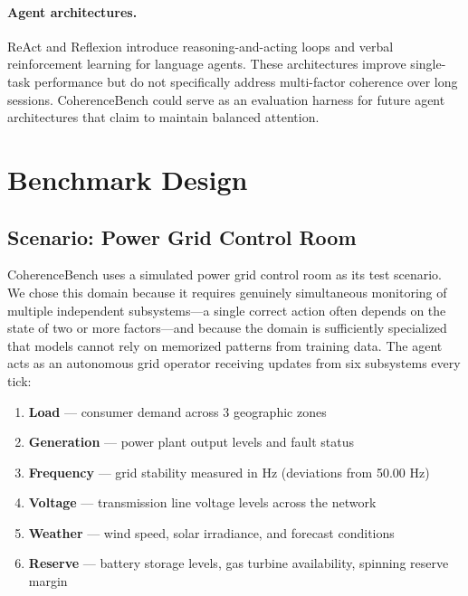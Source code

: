 \documentclass{article}
\begin{document}
\paragraph{Agent architectures.}
ReAct \cite{yao2023react} and Reflexion \cite{shinn2023reflexion}
introduce reasoning-and-acting loops and verbal reinforcement learning
for language agents. These architectures improve single-task performance
but do not specifically address multi-factor coherence over long
sessions. CoherenceBench could serve as an evaluation harness for
future agent architectures that claim to maintain balanced attention.

\section{Benchmark Design}
\label{sec:design}

\subsection{Scenario: Power Grid Control Room}

CoherenceBench uses a simulated power grid control room as its test
scenario. We chose this domain because it requires genuinely simultaneous
monitoring of multiple independent subsystems---a single correct action
often depends on the state of two or more factors---and because the
domain is sufficiently specialized that models cannot rely on memorized
patterns from training data. The agent acts as an autonomous grid
operator receiving updates from six subsystems every tick:

\begin{enumerate}
    \item \textbf{Load} --- consumer demand across 3 geographic zones
    \item \textbf{Generation} --- power plant output levels and fault
    status
    \item \textbf{Frequency} --- grid stability measured in Hz
    (deviations from 50.00 Hz)
    \item \textbf{Voltage} --- transmission line voltage levels across
    the network
    \item \textbf{Weather} --- wind speed, solar irradiance, and
    forecast conditions
    \item \textbf{Reserve} --- battery storage levels, gas turbine
    availability, spinning reserve margin
\end{enumerate}
\end{document}
